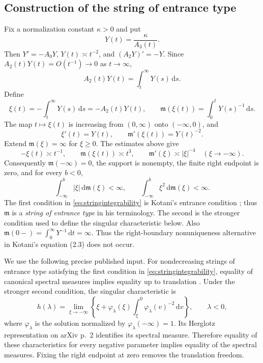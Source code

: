 \documentclass[11pt,letterpaper,reqno]{amsart}
\theoremstyle{plain}
\newcommand{\dd}{\,\mathrm d}
\begin{document}
\subsection{Construction of the string of entrance type}
Fix a normalization constant $\kappa>0$ and put
\begin{equation}\label{eq:Y}
 Y(t)=\frac{\kappa}{A_3(t)}.
\end{equation}
Then $Y'=-A_0Y$, $Y(t)\asymp t^{-2}$, and $(A_2Y)'=-Y$. Since $A_2(t)Y(t)=O(t^{-1})\to0$ as $t\to\infty$,
\[
 A_2(t)Y(t)=\int_t^\infty Y(s)\dd s.
\]
Define
\begin{equation}\label{eq:stringcoordinates}
 \xi(t)=-\int_t^\infty Y(s)\dd s=-A_2(t)Y(t),\qquad
 \mathfrak m(\xi(t))=\int_0^tY(s)^{-1}\dd s.
\end{equation}
The map $t\mapsto\xi(t)$ is increasing from $(0,\infty)$ onto $(-\infty,0)$, and
\begin{equation}\label{eq:stringdensity}
 \xi'(t)=Y(t),\qquad \mathfrak m'(\xi(t))=Y(t)^{-2}.
\end{equation}
Extend $\mathfrak m(\xi)=\infty$ for $\xi\ge0$. The estimates above give
\[
 -\xi(t)\asymp t^{-1},\qquad \mathfrak m(\xi(t))\asymp t^3,
 \qquad \mathfrak m'(\xi)\asymp|\xi|^{-4}\quad(\xi\to-\infty).
\]
Consequently $\mathfrak m(-\infty)=0$, the support is nonempty, the finite right endpoint is zero, and for every $b<0$,
\begin{equation}\label{eq:stringintegrability}
 \int_{-\infty}^b|\xi|\dd\mathfrak m(\xi)<\infty,
 \qquad \int_{-\infty}^b\xi^2\dd\mathfrak m(\xi)<\infty.
\end{equation}
The first condition in \eqref{eq:stringintegrability} is Kotani's entrance condition \cite[condition~(2.1)]{Kotani}; thus $\mathfrak m$ is a \emph{string of entrance type} in his terminology. The second is the stronger condition used to define the singular characteristic below.
Also $\mathfrak m(0-)=\int_0^\infty Y^{-1}\dd t=\infty$. Thus the right-boundary nonuniqueness alternative in Kotani's equation (2.3) does not occur.

We use the following precise published input. For nondecreasing strings of entrance type satisfying the first condition in \eqref{eq:stringintegrability}, equality of canonical spectral measures implies equality up to translation \cite[Theorem 1, arXiv p.~4]{Kotani}. Under the stronger second condition, the singular characteristic is
\begin{equation}\label{eq:characteristic}
 h(\lambda)=\lim_{\xi\to-\infty}\left\{\xi+\varphi_\lambda(\xi)
 \int_\xi^0\varphi_\lambda(v)^{-2}\dd v\right\},\qquad\lambda<0,
\end{equation}
where $\varphi_\lambda$ is the solution normalized by $\varphi_\lambda(-\infty)=1$. Its Herglotz representation on arXiv p.~2 identifies its spectral measure. Therefore equality of these characteristics for every negative parameter implies equality of the spectral measures. Fixing the right endpoint at zero removes the translation freedom.
\end{document}
